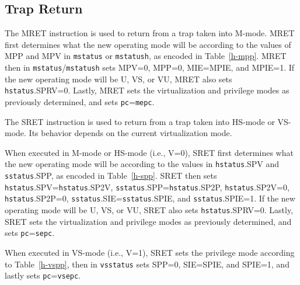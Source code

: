 \subsection{Trap Return}

The MRET instruction is used to return from a trap taken into M-mode.
MRET first determines what the new operating mode will be according to
the values of MPP and MPV in {\tt mstatus} or {\tt mstatush}, as encoded in
Table~\ref{h-mpp}.
MRET then in {\tt mstatus}/{\tt mstatush} sets MPV=0, MPP=0, MIE=MPIE, and MPIE=1.
If the new operating mode will be U, VS, or VU, MRET also sets
{\tt hstatus}.SPRV=0.
Lastly, MRET sets the virtualization and privilege modes as previously
determined, and sets {\tt pc}={\tt mepc}.

The SRET instruction is used to return from a trap taken into HS-mode or
VS-mode.  Its behavior depends on the current virtualization mode.

When executed in M-mode or HS-mode (i.e., V=0), SRET first determines
what the new operating mode will be according to the values in
{\tt hstatus}.SPV and {\tt sstatus}.SPP, as encoded in Table~\ref{h-spp}.
SRET then sets {\tt hstatus}.SPV={\tt hstatus}.SP2V,
{\tt sstatus}.SPP={\tt hstatus}.SP2P, {\tt hstatus}.SP2V=0,
{\tt hstatus}.SP2P=0, {\tt sstatus}.SIE={\tt sstatus}.SPIE, and
{\tt sstatus}.SPIE=1.
If the new operating mode will be U, VS, or VU, SRET also sets
{\tt hstatus}.SPRV=0.
Lastly, SRET sets the virtualization and privilege modes as previously
determined, and sets {\tt pc}={\tt sepc}.

When executed in VS-mode (i.e., V=1), SRET sets the privilege mode according to
Table~\ref{h-vspp}, then in {\tt vsstatus} sets SPP=0, SIE=SPIE, and SPIE=1, and
lastly sets {\tt pc}={\tt vsepc}.
